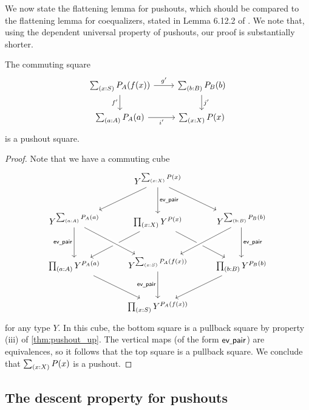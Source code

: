 We now state the flattening lemma for pushouts, which should be compared to the flattening lemma for coequalizers, stated in Lemma 6.12.2 of \cite{hottbook}. We note that, using the dependent universal property of pushouts, our proof is substantially shorter.

\begin{lem}\label{lem:flattening}
The commuting square
\begin{equation*}
\begin{tikzcd}
\sm{x:S}P_A(f(x)) \arrow[d,swap,"{f'}"] \arrow[r,"{g'}"] & \sm{b:B}P_B(b) \arrow[d,"{j'}"] \\
\sm{a:A}P_A(a) \arrow[r,swap,"{i'}"] & \sm{x:X}P(x)
\end{tikzcd}
\end{equation*}
is a pushout square.
\end{lem}

\begin{proof}
Note that we have a commuting cube
\begin{equation*}
\begin{tikzcd}[row sep=large]
& Y^{\sm{x:X}P(x)} \arrow[dl] \arrow[d,"\mathsf{ev\usc{}pair}"] \arrow[dr] \\
Y^{\sm{a:A}P_A(a)} \arrow[d,swap,"\mathsf{ev\usc{}pair}"] & \prd{x:X}Y^{P(x)} \arrow[dl] \arrow[dr] & Y^{\sm{b:B}P_B(b)} \arrow[dl,crossing over] \arrow[d,"\mathsf{ev\usc{}pair}"] \\
\prd{a:A}Y^{P_A(a)} \arrow[dr] & Y^{\sm{x:S}P_A(f(x))} \arrow[from=ul,crossing over] \arrow[d,swap,"\mathsf{ev\usc{}pair}"] & \prd{b:B}Y^{P_B(b)} \arrow[dl] \\
\phantom{\prd{b:B}Y^{P_B(b)}} & \prd{x:S}Y^{P_A(f(x))} & \phantom{\prd{a:A}Y^{P_A(a)}}
\end{tikzcd}
\end{equation*}
for any type $Y$. In this cube, the bottom square is a pullback square by property (iii) of \cref{thm:pushout_up}. The vertical maps (of the form $\mathsf{ev\underline{\ }{}pair}$) are equivalences, so it follows that the top square is a pullback square. We conclude that $\sm{x:X}P(x)$ is a pushout.
\end{proof}

\subsection{The descent property for pushouts}

